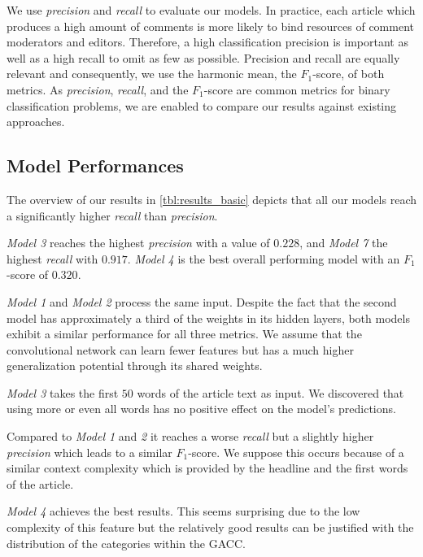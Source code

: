 We use \textit{precision} and \textit{recall} to evaluate our models. 
In practice, each article which produces a high amount of comments is more likely to bind resources of comment moderators and editors. Therefore, a high classification precision is important as well as a high recall to omit as few as possible.
Precision and recall are equally relevant and consequently, we use the harmonic mean, the $F_1$-score, of both metrics. As \textit{precision}, \textit{recall}, and the $F_1$-score are common metrics for binary classification problems, we are enabled to compare our results against existing approaches.

\subsection{Model Performances}
The overview of our results in \autoref{tbl:results_basic} depicts that all our models reach a significantly higher \textit{recall} than \textit{precision}.

\textit{Model 3} reaches the highest \textit{precision} with a value of $0.228$, and \textit{Model 7} the highest \textit{recall} with $0.917$. \textit{Model 4} is the best overall performing model with an $F_1$-score of $0.320$. 

\textit{Model 1} and \textit{Model 2} process the same input. Despite the fact that the second model has approximately a third of the weights in its hidden layers, both models exhibit a similar performance for all three metrics.
We assume that the convolutional network can learn fewer features but has a much higher generalization potential through its shared weights.

\textit{Model 3} takes the first $50$ words of the article text as input. We discovered that using more or even all words has no positive effect on the model's predictions.

Compared to \textit{Model 1} and \textit{2} it reaches a worse \textit{recall} but a slightly higher \textit{precision} which leads to a similar $F_1$-score.
We suppose this occurs because of a similar context complexity which is provided by the headline and the first words of the article.

\textit{Model 4} achieves the best results. This seems surprising due to the low complexity of this feature but the relatively good results can be justified with the distribution of the categories within the GACC. 

